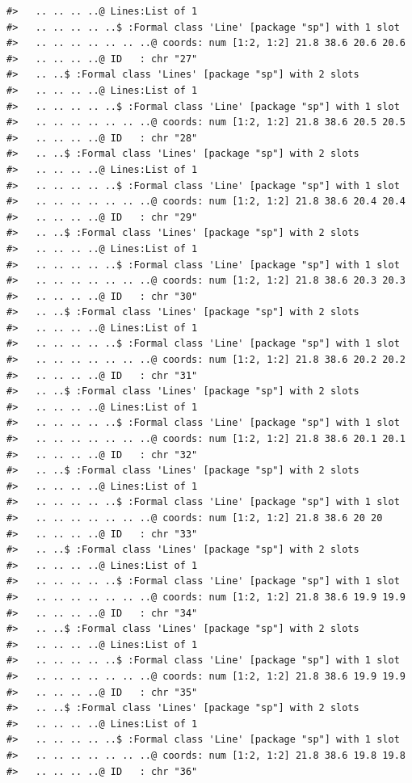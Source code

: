 \documentclass[12pt,a4paper,a4paper]{book}
\theoremstyle{definition}
\theoremstyle{definition}
\theoremstyle{definition}
\theoremstyle{remark}
\begin{document}
\begin{verbatim}
#>   .. .. .. ..@ Lines:List of 1
#>   .. .. .. .. ..$ :Formal class 'Line' [package "sp"] with 1 slot
#>   .. .. .. .. .. .. ..@ coords: num [1:2, 1:2] 21.8 38.6 20.6 20.6
#>   .. .. .. ..@ ID   : chr "27"
#>   .. ..$ :Formal class 'Lines' [package "sp"] with 2 slots
#>   .. .. .. ..@ Lines:List of 1
#>   .. .. .. .. ..$ :Formal class 'Line' [package "sp"] with 1 slot
#>   .. .. .. .. .. .. ..@ coords: num [1:2, 1:2] 21.8 38.6 20.5 20.5
#>   .. .. .. ..@ ID   : chr "28"
#>   .. ..$ :Formal class 'Lines' [package "sp"] with 2 slots
#>   .. .. .. ..@ Lines:List of 1
#>   .. .. .. .. ..$ :Formal class 'Line' [package "sp"] with 1 slot
#>   .. .. .. .. .. .. ..@ coords: num [1:2, 1:2] 21.8 38.6 20.4 20.4
#>   .. .. .. ..@ ID   : chr "29"
#>   .. ..$ :Formal class 'Lines' [package "sp"] with 2 slots
#>   .. .. .. ..@ Lines:List of 1
#>   .. .. .. .. ..$ :Formal class 'Line' [package "sp"] with 1 slot
#>   .. .. .. .. .. .. ..@ coords: num [1:2, 1:2] 21.8 38.6 20.3 20.3
#>   .. .. .. ..@ ID   : chr "30"
#>   .. ..$ :Formal class 'Lines' [package "sp"] with 2 slots
#>   .. .. .. ..@ Lines:List of 1
#>   .. .. .. .. ..$ :Formal class 'Line' [package "sp"] with 1 slot
#>   .. .. .. .. .. .. ..@ coords: num [1:2, 1:2] 21.8 38.6 20.2 20.2
#>   .. .. .. ..@ ID   : chr "31"
#>   .. ..$ :Formal class 'Lines' [package "sp"] with 2 slots
#>   .. .. .. ..@ Lines:List of 1
#>   .. .. .. .. ..$ :Formal class 'Line' [package "sp"] with 1 slot
#>   .. .. .. .. .. .. ..@ coords: num [1:2, 1:2] 21.8 38.6 20.1 20.1
#>   .. .. .. ..@ ID   : chr "32"
#>   .. ..$ :Formal class 'Lines' [package "sp"] with 2 slots
#>   .. .. .. ..@ Lines:List of 1
#>   .. .. .. .. ..$ :Formal class 'Line' [package "sp"] with 1 slot
#>   .. .. .. .. .. .. ..@ coords: num [1:2, 1:2] 21.8 38.6 20 20
#>   .. .. .. ..@ ID   : chr "33"
#>   .. ..$ :Formal class 'Lines' [package "sp"] with 2 slots
#>   .. .. .. ..@ Lines:List of 1
#>   .. .. .. .. ..$ :Formal class 'Line' [package "sp"] with 1 slot
#>   .. .. .. .. .. .. ..@ coords: num [1:2, 1:2] 21.8 38.6 19.9 19.9
#>   .. .. .. ..@ ID   : chr "34"
#>   .. ..$ :Formal class 'Lines' [package "sp"] with 2 slots
#>   .. .. .. ..@ Lines:List of 1
#>   .. .. .. .. ..$ :Formal class 'Line' [package "sp"] with 1 slot
#>   .. .. .. .. .. .. ..@ coords: num [1:2, 1:2] 21.8 38.6 19.9 19.9
#>   .. .. .. ..@ ID   : chr "35"
#>   .. ..$ :Formal class 'Lines' [package "sp"] with 2 slots
#>   .. .. .. ..@ Lines:List of 1
#>   .. .. .. .. ..$ :Formal class 'Line' [package "sp"] with 1 slot
#>   .. .. .. .. .. .. ..@ coords: num [1:2, 1:2] 21.8 38.6 19.8 19.8
#>   .. .. .. ..@ ID   : chr "36"

\end{verbatim}
\end{document}

